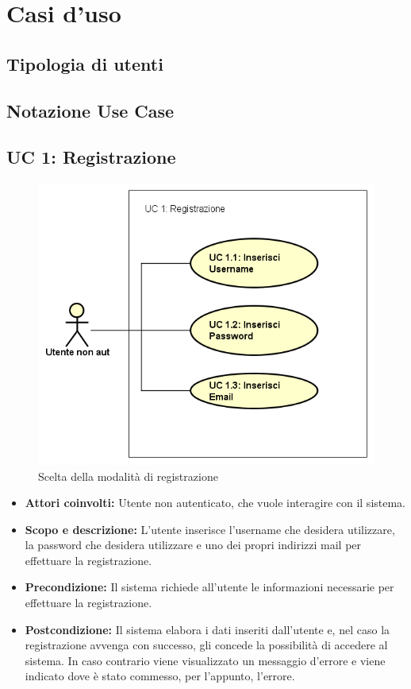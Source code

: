 \section{Casi d'uso}
\subsection{Tipologia di utenti}
\subsection{Notazione Use Case}
\subsection{UC 1: Registrazione}
	\begin{figure}[htbp]
		\centering
		\includegraphics[scale=0.8]{../../Casi D'uso/UC1.png}
		\caption{Scelta della modalità di registrazione}
	\end{figure}
	\begin{itemize}
		\item \textbf{Attori coinvolti:} Utente non autenticato, che vuole interagire con il sistema. \\
		\item \textbf{Scopo e descrizione:} L'utente inserisce l'username che desidera utilizzare, la password che desidera utilizzare e uno dei propri indirizzi mail per effettuare la registrazione. \\
		\item \textbf{Precondizione:} Il sistema richiede all'utente le informazioni necessarie per effettuare la registrazione. \\
		\item \textbf{Postcondizione:} Il sistema elabora i dati inseriti dall'utente e, nel caso la registrazione avvenga con successo, gli concede la possibilità di accedere al sistema. In caso contrario viene visualizzato un messaggio d'errore e viene indicato dove è stato commesso, per l'appunto, l'errore. \\
	\end{itemize}
